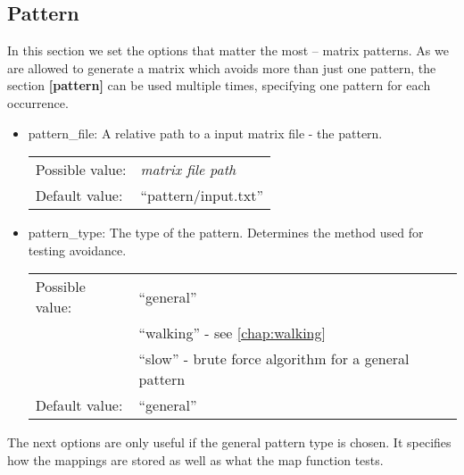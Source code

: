 \subsection{Pattern}
In this section we set the options that matter the most -- matrix patterns. As we are allowed to generate a matrix which avoids more than just one pattern, the section \textbf{[pattern]} can be used multiple times, specifying one pattern for each occurrence.
\begin{itemize}
\item pattern\_file: A relative path to a input matrix file - the pattern.

\begin{tabular}{ll}
Possible value: & \textit{matrix file path} \\
Default value: & ``pattern/input.txt''
\end{tabular}

\item pattern\_type: The type of the pattern. Determines the method used for testing avoidance.

\begin{tabular}{ll}
Possible value: & ``general'' \\
& ``walking'' - see \autoref{chap:walking} \\
& ``slow'' - brute force algorithm for a general pattern \\
Default value: & ``general''
\end{tabular}
\end{itemize}

The next options are only useful if the general pattern type is chosen. It specifies how the mappings are stored as well as what the map function tests.

